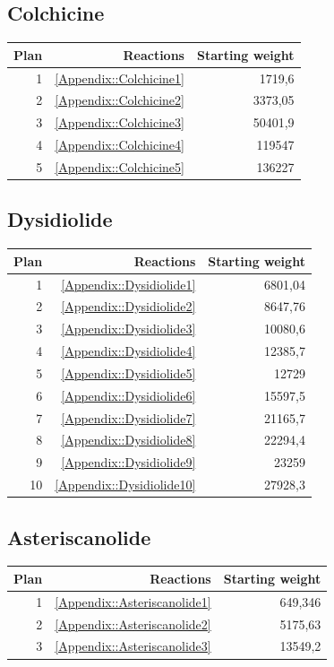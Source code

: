 \documentclass[a4paper,10pt,titlepage]{paper}
\begin{document}
\subsection{Colchicine} 
\begin{table}[H]
\centering
\begin{tabular}{|r|r|r|}
\hline
Plan & Reactions & Starting weight \\ \hline
1 & \ref{Appendix::Colchicine1} & 1719,6 \\\hline
2 & \ref{Appendix::Colchicine2} & 3373,05 \\\hline
3 & \ref{Appendix::Colchicine3} & 50401,9 \\\hline
4 & \ref{Appendix::Colchicine4} & 119547 \\\hline
5 & \ref{Appendix::Colchicine5} & 136227 \\\hline
\end{tabular}
\end{table}

\subsection{Dysidiolide}
\begin{table}[H]
\centering
\begin{tabular}{|r|r|r|}
\hline
Plan & Reactions & Starting weight \\ \hline
1 & \ref{Appendix::Dysidiolide1} & 6801,04 \\\hline
2 & \ref{Appendix::Dysidiolide2} & 8647,76 \\\hline
3 & \ref{Appendix::Dysidiolide3} & 10080,6 \\\hline
4 & \ref{Appendix::Dysidiolide4} & 12385,7 \\\hline
5 & \ref{Appendix::Dysidiolide5} & 12729 \\\hline
6 & \ref{Appendix::Dysidiolide6} & 15597,5 \\\hline
7 & \ref{Appendix::Dysidiolide7} & 21165,7 \\\hline
8 & \ref{Appendix::Dysidiolide8} & 22294,4 \\\hline
9 & \ref{Appendix::Dysidiolide9} & 23259 \\\hline
10 & \ref{Appendix::Dysidiolide10} & 27928,3 \\\hline
\end{tabular}
\end{table}

\subsection{Asteriscanolide}
\begin{table}[H]
\centering
\begin{tabular}{|r|r|r|}
\hline
Plan & Reactions & Starting weight \\ \hline
1 & \ref{Appendix::Asteriscanolide1} & 649,346 \\\hline
2 & \ref{Appendix::Asteriscanolide2} & 5175,63 \\\hline
3 & \ref{Appendix::Asteriscanolide3} & 13549,2 \\\hline
\end{tabular}
\end{table}
\end{document}
